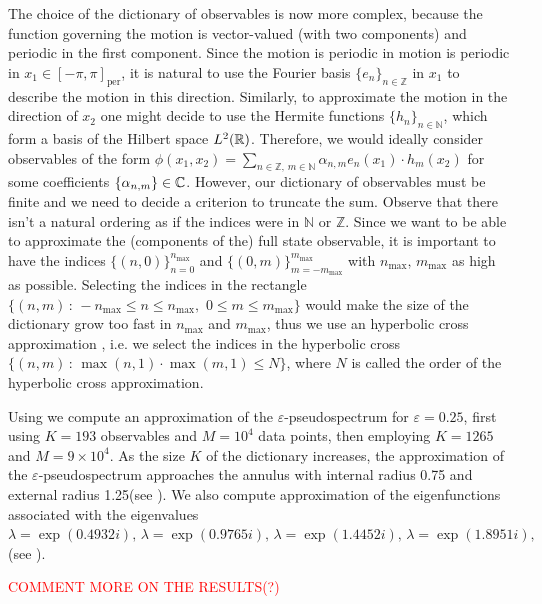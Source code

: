 The choice of the dictionary of observables is now more complex, because the function governing the motion is vector-valued (with two components) and periodic in the first component. Since the motion is periodic in motion is periodic in $x_1\in[-\pi,\pi]_{\text{per}}$, it is natural to use the Fourier basis $\{e_n\}_{n\in\mathbb{Z}}$ in $x_1$ to describe the motion in this direction. Similarly, to approximate the motion in the direction of $x_2$ one might decide to use the Hermite functions $\{h_n\}_{n\in\mathbb{N}}$, which form a basis of the Hilbert space $L^2(\mathbb{R})$. Therefore, we would ideally consider observables of the form $\phi(x_1, x_2) = \sum_{n\in\mathbb{Z},\,m\in\mathbb{N}} \alpha_{n,m} e_n(x_1)\cdot h_m(x_2)$ for some coefficients $\{\alpha_{n,m}\}\in\mathbb{C}$. However, our dictionary of observables must be finite and we need to decide a criterion to truncate the sum. Observe that there isn't a natural ordering as if the indices were in $\mathbb{N}$ or $\mathbb{Z}$. Since we want to be able to approximate the (components of the) full state observable, it is important to have the indices $\{(n,0)\}_{n=0}^{n_{\max}}$ and $\{(0,m)\}_{m=-m_{\max}}^{m_{\max}}$ with $n_{\max},\,m_{\max}$ as high as possible. Selecting the indices in the rectangle $\{(n,m)\,:\,-n_{\max}\leq n\leq n_{\max},\,\, 0\leq m\leq m_{\max}\}$ would make the size of the dictionary grow too fast in $n_{\max}$ and $m_{\max}$, thus we use an hyperbolic cross approximation \cite{dung_hyperbolic_2017}, i.e. we select the indices in the hyperbolic cross $\{(n,m)\,:\, \max(n,1)\cdot \max(m,1)\leq N \}$, where $N$ is called the order of the hyperbolic cross approximation.

Using  we compute an approximation of the $\varepsilon$-pseudospectrum for $\varepsilon = 0.25$, first using $K=193$ observables and $M = 10^4$ data points, then employing $K=1265$ and $M = 9 \times 10^4$. As the size $K$ of the dictionary increases, the approximation of the $\varepsilon$-pseudospectrum approaches the annulus with internal radius 0.75 and external radius 1.25(see ). We also compute approximation of the eigenfunctions associated with the eigenvalues $\lambda = \exp(0.4932 i), \,\lambda = \exp(0.9765 i), \,\lambda = \exp(1.4452 i), \,\lambda = \exp(1.8951 i), \,$ (see ).

\textcolor{red}{COMMENT MORE ON THE RESULTS(?)}

